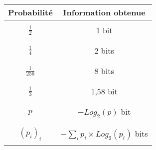 \documentclass{slides}
\begin{document}
\begin{slide}
\begin{tabular}{|c|c|}
\hline
Probabilité & Information obtenue \\
\hline
& \\
$\frac{1}{2}$ & 1 bit \\
& \\
\hline
& \\
$\frac{1}{4}$ & 2 bits \\
& \\
\hline
& \\
$\frac{1}{256}$ & 8 bits \\
& \\
\hline
& \\
$\frac{1}{3}$ & 1,58 bit \\
& \\
\hline
& \\
$p$ & $- Log_2(p)$ bit \\
& \\
\hline
& \\
$(p_i)_i$ & $- \sum_i p_i \times Log_2(p_i)$ bits \\
& \\
\hline
\end{tabular}
\end{slide}
\end{document}
